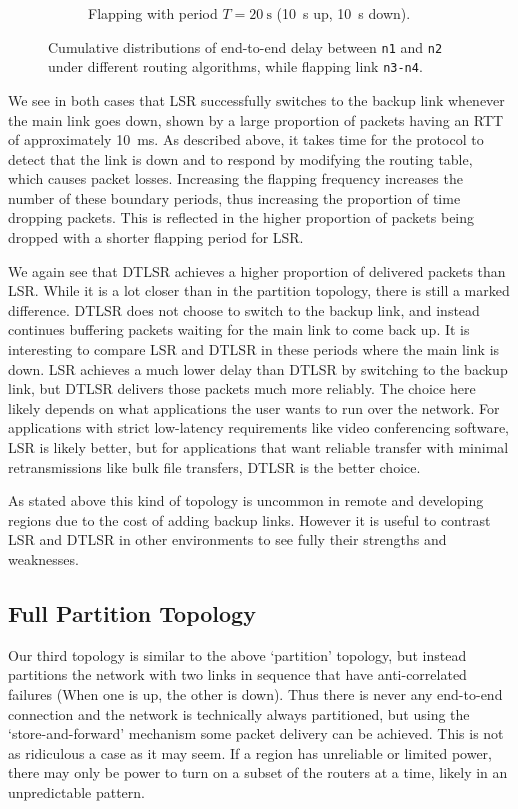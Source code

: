 \documentclass[withindex,glossary,openany]{cam-thesis}
\begin{document}
\begin{figure}
\begin{subfigure}{9.7cm}
  \caption{Flapping with period $T=\SI{20}{\s}$ (\SI{10}{\s} up, \SI{10}{\s} down).}
  \label{fig:box_20}
\end{subfigure}
\caption{Cumulative distributions of end-to-end delay between \texttt{n1} and \texttt{n2} under different routing algorithms, while flapping link \texttt{n3-n4}.}
\label{fig:box}
\end{figure}

We see in both cases that LSR successfully switches to the backup link whenever the main link goes down, shown by a large proportion of packets having an RTT of approximately \SI{10}{\ms}. As described above, it takes time for the protocol to detect that the link is down and to respond by modifying the routing table, which causes packet losses. Increasing the flapping frequency increases the number of these boundary periods, thus increasing the proportion of time dropping packets. This is reflected in the higher proportion of packets being dropped with a shorter flapping period for LSR.

We again see that DTLSR achieves a higher proportion of delivered packets than LSR. While it is a lot closer than in the partition topology, there is still a marked difference. DTLSR does not choose to switch to the backup link, and instead continues buffering packets waiting for the main link to come back up. It is interesting to compare LSR and DTLSR in these periods where the main link is down. LSR achieves a much lower delay than DTLSR by switching to the backup link, but DTLSR delivers those packets much more reliably. The choice here likely depends on what applications the user wants to run over the network. For applications with strict low-latency requirements like video conferencing software, LSR is likely better, but for applications that want reliable transfer with minimal retransmissions like bulk file transfers, DTLSR is the better choice.

As stated above this kind of topology is uncommon in remote and developing regions due to the cost of adding backup links. However it is useful to contrast LSR and DTLSR in other environments to see fully their strengths and weaknesses.


\subsection{Full Partition Topology}

Our third topology is similar to the above `partition' topology, but instead partitions the network with two links in sequence that have anti-correlated failures (When one is up, the other is down). Thus there is never any end-to-end connection and the network is technically always partitioned, but using the `store-and-forward' mechanism some packet delivery can be achieved. This is not as ridiculous a case as it may seem. If a region has unreliable or limited power, there may only be power to turn on a subset of the routers at a time, likely in an unpredictable pattern.
\end{document}
